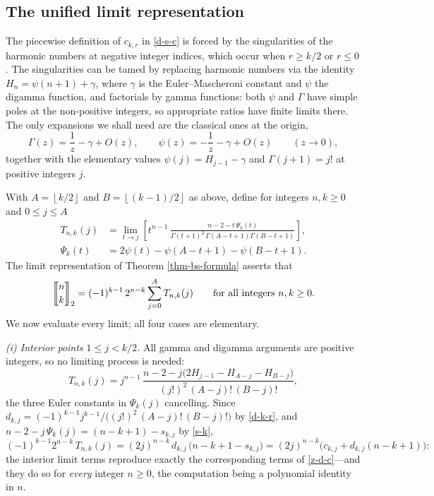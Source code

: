 \documentclass[a4paper]{amsart}
\numberwithin{equation}{section}
\newcommand{\mStirling}[0]{\genfrac{\llbracket}{\rrbracket}{0pt}{}}
\newcommand{\floor}[1]{\left\lfloor #1 \right\rfloor}
\begin{document}
\subsection*{The unified limit representation}
The piecewise definition of $c_{k,r}$ in \eqref{d-s-c} is forced by the singularities of the harmonic numbers at negative integer indices, which occur when $r \geq k/2$ or $r \leq 0$. The singularities can be tamed by replacing harmonic numbers via the identity $H_n = \psi(n+1)+\gamma$, where $\gamma$ is the Euler--Mascheroni constant and $\psi$ the digamma function, and factorials by gamma functions: both $\psi$ and $\Gamma$ have simple poles at the non-positive integers, so appropriate ratios have finite limits there. The only expansions we shall need are the classical ones at the origin,
\[
\Gamma(z) = \frac{1}{z} - \gamma + O(z), \qquad \psi(z) = -\frac{1}{z} - \gamma + O(z) \qquad (z \to 0),
\]
together with the elementary values $\psi(j) = H_{j-1} - \gamma$ and $\Gamma(j+1) = j!$ at positive integers $j$.

With $A = \floor{k/2}$ and $B = \floor{(k-1)/2}$ as above, define for integers $n, k \geq 0$ and $0 \leq j \leq A$
\[
\begin{aligned}
T_{n,k}(j) &= \lim_{t \to j} \left[t^{n-1}\,
        \frac
            {n-2-t\,\Psi_k(t)}
            {\Gamma(t+1)^{2}\, \Gamma\left(A-t+1\right) \Gamma\left(B-t+1\right)}\right],
        \\
        \Psi_k(t) &= 2\psi(t)-\psi\left(A-t+1\right)-\psi\left(B-t+1\right).
\end{aligned}
\]
The limit representation of Theorem \ref{thm-bs-formula} asserts that
\begin{equation}\label{eq-limit-claim}
\mStirling{n}{k}_2 = (-1)^{k-1}\, 2^{n-k} \sum_{j=0}^{A} T_{n,k}(j) \qquad \text{for all integers } n, k \geq 0.
\end{equation}
We now evaluate every limit; all four cases are elementary.

\emph{(i) Interior points $1 \leq j < k/2$.} All gamma and digamma arguments are positive integers, so no limiting process is needed:
\[
T_{n,k}(j) = j^{n-1}\,\frac{n - 2 - j\big(2H_{j-1} - H_{A-j} - H_{B-j}\big)}{(j!)^2\,(A-j)!\,(B-j)!},
\]
the three Euler constants in $\Psi_k(j)$ cancelling. Since $d_{k,j} = (-1)^{k-1}j^{k-1}\big/\big((j!)^2\,(A-j)!\,(B-j)!\big)$ by \eqref{d-k-r}, and $n - 2 - j\,\Psi_k(j) = (n-k+1) - s_{k,j}$ by \eqref{s-k},
\[
(-1)^{k-1}2^{n-k}\,T_{n,k}(j) = (2j)^{n-k}\,d_{k,j}\,\big(n-k+1-s_{k,j}\big) = (2j)^{n-k}\big(c_{k,j} + d_{k,j}(n-k+1)\big):
\]
the interior limit terms reproduce exactly the corresponding terms of \eqref{z-d-c}---and they do so for \emph{every} integer $n \geq 0$, the computation being a polynomial identity in $n$.
\end{document}
